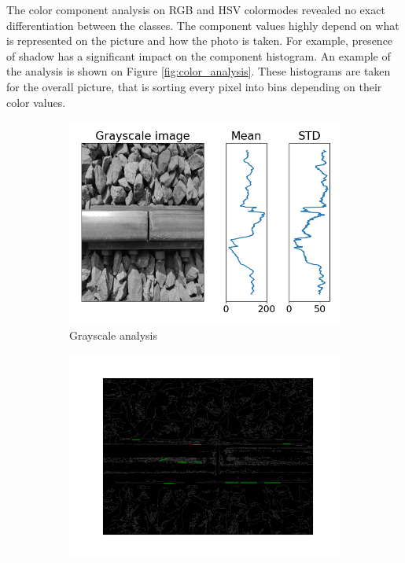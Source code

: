 \documentclass[10pt, final]{article}
\begin{document}
The color component analysis on RGB and HSV colormodes revealed no exact differentiation between the classes.
The component values highly depend on what is represented on the picture and how the photo is taken.
For example, presence of shadow has a significant impact on the component histogram.
An example of the analysis is shown on Figure \ref{fig:color_analysis}.
These histograms are taken for the overall picture, that is sorting every pixel into bins depending on their color values.

\begin{figure}[!ht]
	\centering
	\begin{subfigure}{0.3\textwidth}
		\centering
		\includegraphics[width=\textwidth]{./tex_graphs/rail_surf_gray.png}
		\caption{Grayscale analysis}
		\label{fig:rail_surf_gray}
	\end{subfigure}
	\begin{subfigure}{0.3\textwidth}
		\centering
		\includegraphics[width=\textwidth]{./tex_graphs/rail_surf_edge.png}

\end{subfigure}
\end{figure}
\end{document}
